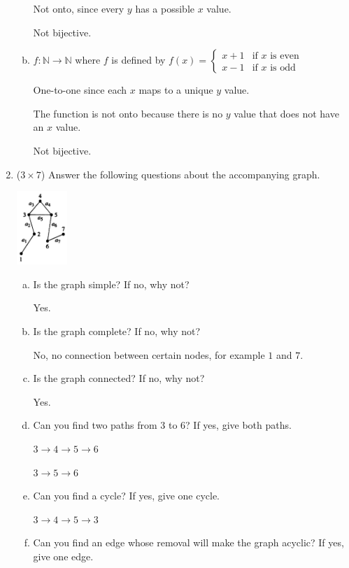 \documentclass[12pt]{article}
\begin{document}
\begin{enumerate}
\begin{enumerate}[a.]
					Not onto, since every $y$ has a possible $x$ value.

					Not bijective.

					\item
					$f: \mathbb{N} \to \mathbb{N}$ where $f$ is defined by $f\left(x\right) = \left\lbrace
					\begin{array}{ll}
					x + 1 & \mbox{if } x \mbox{ is even } \\
					x - 1 & \mbox{if } x \mbox{ is odd }
					\end{array}
					\right.$

					One-to-one since each $x$ maps to a unique $y$ value.

					The function is not onto because there is no $y$ value that does not have an $x$ value.

					Not bijective.
				\end{enumerate}


		\newpage
		\item ($3 \times 7$)
		Answer the following questions about the accompanying graph.
		\begin{center}
			\includegraphics[width=0.15\textwidth]{HW10-1}
		\end{center}
		\begin{enumerate}[a.]
			\item
			Is the graph simple? If no, why not?

			Yes.
			\item
			Is the graph complete? If no, why not?

			No, no connection between certain nodes, for example $1$ and $7$.
			\item
			Is the graph connected? If no, why not?

			Yes.
			\item
			Can you find two paths from 3 to 6? If yes, give both paths.

			$3 \to 4 \to 5 \to 6$

			$3 \to 5 \to 6$
			\item
			Can you find a cycle? If yes, give one cycle.

			$3 \to 4 \to 5 \to 3$
			\item
			Can you find an edge whose removal will make the graph acyclic? If yes, give one edge.


\end{enumerate}
\end{enumerate}
\end{document}
